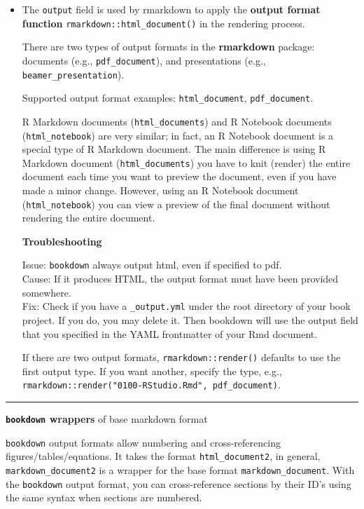 \documentclass[
  a4paper,
  twoside,
  openright]{book}
\theoremstyle{definition}
\theoremstyle{definition}
\theoremstyle{definition}
\theoremstyle{definition}
\theoremstyle{remark}
\begin{document}
\begin{itemize}
\item
  The \texttt{output} field is used by rmarkdown to apply the {\textbf{output format function}} \texttt{rmarkdown::html\_document()} in the rendering process.

  There are two types of output formats in the \textbf{rmarkdown} package: documents (e.g., \texttt{pdf\_document}), and presentations (e.g., \texttt{beamer\_presentation}).

  Supported output format examples: \texttt{html\_document}, \texttt{pdf\_document}.

  R Markdown documents (\texttt{html\_documents}) and R Notebook documents (\texttt{html\_notebook}) are very similar; in fact, an R Notebook document is a special type of R Markdown document. The main difference is using R Markdown document (\texttt{html\_documents}) you have to knit (render) the entire document each time you want to preview the document, even if you have made a minor change. However, using an R Notebook document (\texttt{html\_notebook}) you can view a preview of the final document without rendering the entire document.

  \textbf{Troubleshooting}

  Issue: \texttt{bookdown} always output html, even if specified to pdf.\\
  Cause: If it produces HTML, the output format must have been provided somewhere.\\
  Fix: Check if you have a \texttt{\_output.yml} under the root directory of your book project. If you do, you may delete it. Then bookdown will use the output field that you specified in the YAML frontmatter of your Rmd document.

  If there are two output formats, \texttt{rmarkdown::render()} defaults to use the first output type. If you want another, specify the type, e.g., \texttt{rmarkdown::render("0100-RStudio.Rmd",\ \textquotesingle{}pdf\_document\textquotesingle{})}.
\end{itemize}

\begin{center}\rule{0.5\linewidth}{0.5pt}\end{center}

\textbf{\texttt{bookdown} wrappers} of base markdown format

{\texttt{bookdown} output formats} allow numbering and cross-referencing figures/tables/equations. It takes the format \texttt{html\_document2}, in general, \texttt{markdown\_document2} is a wrapper for the base format \texttt{markdown\_document}. With the \texttt{bookdown} output format, you can cross-reference sections by their ID's using the same syntax when sections are numbered.
\end{document}
